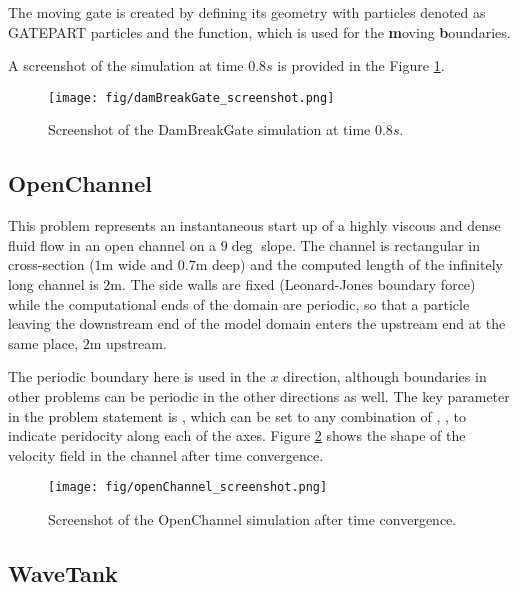 The moving gate is created by defining its geometry with particles
denoted as GATEPART particles and the  function, which
is used for the \textbf{m}oving \textbf{b}oundaries.

A screenshot of the simulation at time $0.8s$ is provided
in the Figure \ref{fig:DamBreakGate}.

\begin{figure}[h]
  \begin{center}
    \texttt{[image: fig/damBreakGate\_screenshot.png]}
    \caption{Screenshot of the DamBreakGate simulation at time $0.8s$.}\label{fig:DamBreakGate}   
  \end{center}
\end{figure}

\subsection{OpenChannel}

This problem represents an instantaneous start up of a highly viscous
and dense fluid flow in an open channel on a $9\deg$ slope. The
channel is rectangular in cross-section ($1$m wide and $0.7$m deep) and
the computed length of the infinitely long channel is $2$m. The side
walls are fixed (Leonard-Jones boundary force) while the computational
ends of the domain are periodic, so that a particle leaving the
downstream end of the model domain enters the upstream end at the same
place, $2$m upstream.

The periodic boundary here is used in the $x$ direction, although
boundaries in other problems can be periodic in the other directions as
well. The key parameter in the problem statement is
, which can be set to any combination of
, ,  to indicate
peridocity along each of the axes.
Figure \ref{fig:OpenChannel} shows the shape of the velocity field in 
the channel after time convergence.
\begin{figure}[h]
  \begin{center}
    \texttt{[image: fig/openChannel\_screenshot.png]}
    \caption{Screenshot of the OpenChannel simulation after time convergence.}\label{fig:OpenChannel}
  \end{center}
\end{figure}

\subsection{WaveTank}

